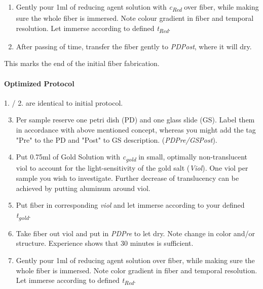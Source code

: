 \begin{appendices}
\begin{enumerate}
	\item Gently pour 1ml of reducing agent solution with \textit{c\textsubscript{Red}} over fiber, while making sure the whole fiber is immersed. Note colour gradient in fiber and temporal resolution. Let immerse according to defined \textit{t\textsubscript{Red}}.
	
	\item After passing of time, transfer the fiber gently to \textit{PDPost}, where it will dry.
\end{enumerate}

\begin{center}
	This marks the end of the initial fiber fabrication.
\end{center}


\paragraph{Optimized Protocol} \hfill\newline

1. / 2. are identical to initial protocol.

\begin{enumerate}
	\setcounter{enumi}{2}
	
	\item Per sample reserve one petri dish (PD) and one glass slide (GS). Label them in accordance with above mentioned concept, whereas you might add the tag "Pre" to the PD and "Post" to GS description. (\textit{PDPre/GSPost}).
	
	\item Put 0.75ml of Gold Solution with \textit{c\textsubscript{gold}} in small, optimally non-translucent viol to account for the light-sensitivity of the gold salt (\textit{Viol}). One viol per sample you wish to investigate. Further decrease of translucency can be achieved by putting aluminum around viol.
	
	\item Put fiber in corresponding \textit{viol} and let immerse according to your defined \textit{t\textsubscript{gold}}.
	\item Take fiber out viol and put in \textit{PDPre} to let dry. Note change in color and/or structure. Experience shows that 30 minutes is sufficient.
	
	\item Gently pour 1ml of reducing agent solution over fiber, while making sure the whole fiber is immersed. Note color gradient in fiber and temporal resolution. Let immerse according to defined \textit{t\textsubscript{Red}}.
	

\end{enumerate}
\end{appendices}
